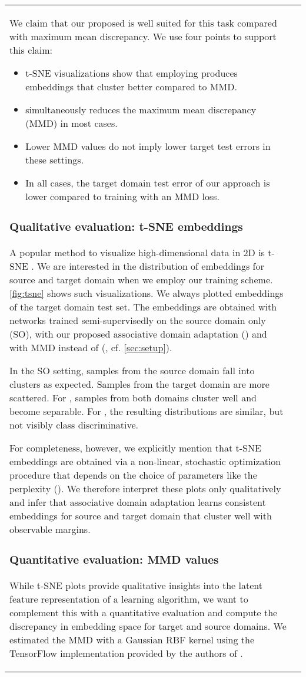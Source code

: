 \documentclass[10pt,twocolumn,letterpaper]{article}
\begin{document}
\begin{table}[t!]
\begin{tabular}{>{\centering\arraybackslash}m{2cm}  >{\centering\arraybackslash}m{4cm}}
We claim that our proposed  is well suited for this task compared with maximum mean discrepancy. We use four points to support this claim:

\begin{itemize}
    \item t-SNE visualizations show that employing  produces embeddings that cluster better compared to MMD.
    \item  simultaneously reduces the maximum mean discrepancy (MMD) in most cases.
    \item Lower MMD values do not imply lower target test errors in these settings.
    \item In all cases, the target domain test error of our approach is lower compared to training with an MMD loss.
\end{itemize}

\subsubsection{Qualitative evaluation: t-SNE embeddings}\label{sec:tsne}
A popular method to visualize high-dimensional data in 2D is t-SNE \cite{maaten2008visualizing}. 
We are interested in the distribution of embeddings for source and target domain when we employ our training scheme. 
\autoref{fig:tsne} shows such visualizations. We always plotted embeddings of the target domain test set.
The embeddings are obtained with networks trained semi-supervisedly \cite{Haeusser2017} on the source domain only (SO), with our proposed associative domain adaptation () and with MMD instead of  (, cf. \autoref{sec:setup}).

In the SO setting, samples from the source domain fall into clusters as expected. Samples from the target domain are more scattered.
For , samples from both domains cluster well and become separable.
For , the resulting distributions are similar, but not visibly class discriminative. 

For completeness, however, we explicitly mention that t-SNE embeddings are obtained via a non-linear, stochastic optimization procedure that depends on the choice of parameters like the perplexity (\cite{maaten2008visualizing, wattenberg2016how}). 
We therefore interpret these plots only qualitatively and infer that associative domain adaptation learns consistent embeddings for source and target domain that cluster well with observable margins.


\subsubsection{Quantitative evaluation: MMD values}
While t-SNE plots provide qualitative insights into the latent feature representation of a learning algorithm, we want to complement this with a quantitative evaluation and compute the discrepancy in embedding space for target and source domains.
We estimated the MMD with a Gaussian RBF kernel using the TensorFlow implementation provided by the authors of \cite{sutherland2016generative}.


\end{tabular}
\end{table}
\end{document}
